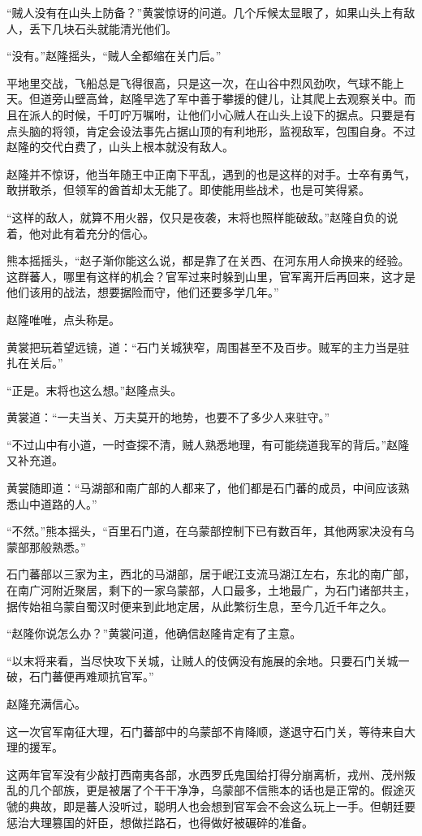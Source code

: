 “贼人没有在山头上防备？”黄裳惊讶的问道。几个斥候太显眼了，如果山头上有敌人，丢下几块石头就能清光他们。

“没有。”赵隆摇头，“贼人全都缩在关门后。”

平地里交战，飞船总是飞得很高，只是这一次，在山谷中烈风劲吹，气球不能上天。但道旁山壁高耸，赵隆早选了军中善于攀援的健儿，让其爬上去观察关中。而且在派人的时候，千叮咛万嘱咐，让他们小心贼人在山头上设下的据点。只要是有点头脑的将领，肯定会设法事先占据山顶的有利地形，监视敌军，包围自身。不过赵隆的交代白费了，山头上根本就没有敌人。

赵隆并不惊讶，他当年随王中正南下平乱，遇到的也是这样的对手。士卒有勇气，敢拼敢杀，但领军的酋首却太无能了。即使能用些战术，也是可笑得紧。

“这样的敌人，就算不用火器，仅只是夜袭，末将也照样能破敌。”赵隆自负的说着，他对此有着充分的信心。

熊本摇摇头，“赵子渐你能这么说，都是靠了在关西、在河东用人命换来的经验。这群蕃人，哪里有这样的机会？官军过来时躲到山里，官军离开后再回来，这才是他们该用的战法，想要据险而守，他们还要多学几年。”

赵隆唯唯，点头称是。

黄裳把玩着望远镜，道：“石门关城狭窄，周围甚至不及百步。贼军的主力当是驻扎在关后。”

“正是。末将也这么想。”赵隆点头。

黄裳道：“一夫当关、万夫莫开的地势，也要不了多少人来驻守。”

“不过山中有小道，一时查探不清，贼人熟悉地理，有可能绕道我军的背后。”赵隆又补充道。

黄裳随即道：“马湖部和南广部的人都来了，他们都是石门蕃的成员，中间应该熟悉山中道路的人。”

“不然。”熊本摇头，“百里石门道，在乌蒙部控制下已有数百年，其他两家决没有乌蒙部那般熟悉。”

石门蕃部以三家为主，西北的马湖部，居于岷江支流马湖江左右，东北的南广部，在南广河附近聚居，剩下的一家乌蒙部，人口最多，土地最广，为石门诸部共主，据传始祖乌蒙自蜀汉时便来到此地定居，从此繁衍生息，至今几近千年之久。

“赵隆你说怎么办？”黄裳问道，他确信赵隆肯定有了主意。

“以末将来看，当尽快攻下关城，让贼人的伎俩没有施展的余地。只要石门关城一破，石门蕃便再难顽抗官军。”

赵隆充满信心。

这一次官军南征大理，石门蕃部中的乌蒙部不肯降顺，遂退守石门关，等待来自大理的援军。

这两年官军没有少敲打西南夷各部，水西罗氏鬼国给打得分崩离析，戎州、茂州叛乱的几个部族，更是被屠了个干干净净，乌蒙部不信熊本的话也是正常的。假途灭虢的典故，即是蕃人没听过，聪明人也会想到官军会不会这么玩上一手。但朝廷要惩治大理篡国的奸臣，想做拦路石，也得做好被碾碎的准备。

